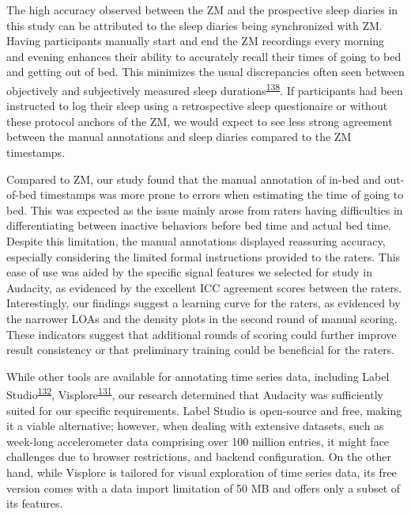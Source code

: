 \documentclass[
  10pt,
]{scrbook}
\begin{document}
The high accuracy observed between the ZM and the prospective sleep
diaries in this study can be attributed to the sleep diaries being
synchronized with ZM. Having participants manually start and end the ZM
recordings every morning and evening enhances their ability to
accurately recall their times of going to bed and getting out of bed.
This minimizes the usual discrepancies often seen between objectively
and subjectively measured sleep
durations\textsuperscript{\protect\hyperlink{ref-aili_reliability_2017}{138}}.
If participants had been instructed to log their sleep using a
retrospective sleep questionaire or without these protocol anchors of
the ZM, we would expect to see less strong agreement between the manual
annotations and sleep diaries compared to the ZM timestamps.

Compared to ZM, our study found that the manual annotation of in-bed and
out-of-bed timestamps was more prone to errors when estimating the time
of going to bed. This was expected as the issue mainly arose from raters
having difficulties in differentiating between inactive behaviors before
bed time and actual bed time. Despite this limitation, the manual
annotations displayed reassuring accuracy, especially considering the
limited formal instructions provided to the raters. This ease of use was
aided by the specific signal features we selected for study in Audacity,
as evidenced by the excellent ICC agreement scores between the raters.
Interestingly, our findings suggest a learning curve for the raters, as
evidenced by the narrower LOAs and the density plots in the second round
of manual scoring. These indicators suggest that additional rounds of
scoring could further improve result consistency or that preliminary
training could be beneficial for the raters.

While other tools are available for annotating time series data,
including Label
Studio\textsuperscript{\protect\hyperlink{ref-label_studio}{132}},
Visplore\textsuperscript{\protect\hyperlink{ref-visplore}{131}}, our
research determined that Audacity was sufficiently suited for our
specific requirements. Label Studio is open-source and free, making it a
viable alternative; however, when dealing with extensive datasets, such
as week-long accelerometer data comprising over 100 million entries, it
might face challenges due to browser restrictions, and backend
configuration. On the other hand, while Visplore is tailored for visual
exploration of time series data, its free version comes with a data
import limitation of 50 MB and offers only a subset of its features.
\end{document}
